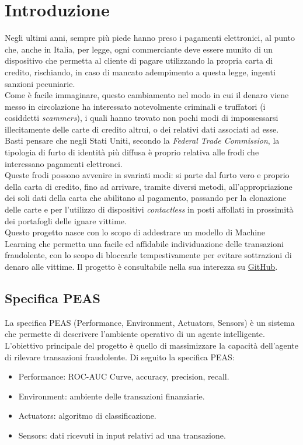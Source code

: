 \documentclass[]{article}
\begin{document}
\section{Introduzione}
    Negli ultimi anni, sempre più piede hanno preso i pagamenti elettronici, al punto che, anche in Italia, per legge, ogni commerciante deve essere munito di un dispositivo che permetta al cliente di pagare utilizzando la propria carta di credito, rischiando, in caso di mancato adempimento a questa legge, ingenti sanzioni pecuniarie.\\
    Come è facile immaginare, questo cambiamento nel modo in cui il denaro viene messo in circolazione ha interessato notevolmente criminali e truffatori (i cosiddetti \textit{scammers}), i quali hanno trovato non pochi modi di impossessarsi illecitamente delle carte di credito altrui, o dei relativi dati associati ad esse.
    Basti pensare che negli Stati Uniti, secondo la \textit{Federal Trade Commission}, la tipologia di furto di identità più diffusa è proprio relativa alle frodi che interessano pagamenti elettronci.\\
    Queste frodi possono avvenire in svariati modi: si parte dal furto vero e proprio della carta di credito, fino ad arrivare, tramite diversi metodi, all'appropriazione dei soli dati della carta che abilitano al pagamento, passando per la clonazione delle carte e per l'utilizzo di dispositivi \textit{contactless} in posti affollati in prossimità dei portafogli delle ignare vittime.\\
    Questo progetto nasce con lo scopo di addestrare un modello di Machine Learning che permetta una facile ed affidabile individuazione delle transazioni fraudolente, con lo scopo di bloccarle tempestivamente per evitare sottrazioni di denaro alle vittime.
    Il progetto è consultabile nella sua interezza su \href{https://github.com/marcosantoriello/CCFDetector}{GitHub}.

    \subsection{Specifica PEAS}
        La specifica PEAS (Performance, Environment, Actuators, Sensors) è un sistema che permette di descrivere l'ambiente operativo di un agente intelligente. L'obiettivo principale del progetto è quello di massimizzare la capacità dell'agente di rilevare transazioni fraudolente. Di seguito la specifica PEAS:
        \begin{itemize}
            \item Performance: ROC-AUC Curve, accuracy, precision, recall.
            \item Environment: ambiente delle transazioni finanziarie.
            \item Actuators: algoritmo di classificazione.
            \item Sensors: dati ricevuti in input relativi ad una transazione.
        \end{itemize}
\end{document}
